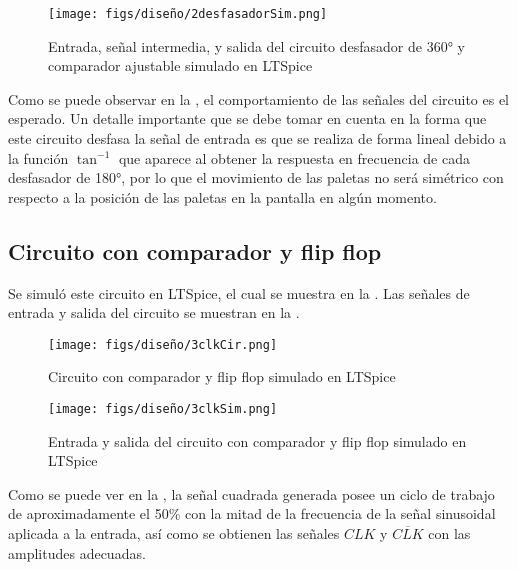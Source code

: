 \begin{figure}[H]
    \centering
    \texttt{[image: figs/diseño/2desfasadorSim.png]}
    \caption{Entrada, señal intermedia, y salida del circuito desfasador de 360° y comparador ajustable simulado en LTSpice}
    \label{desfasadorSim}
\end{figure}

Como se puede observar en la , el comportamiento de las señales del circuito es el esperado.
Un detalle importante que se debe tomar en cuenta en la forma que este circuito desfasa la señal de entrada es que se realiza de forma lineal debido a la función $\tan^{-1}$ que aparece al obtener la respuesta en frecuencia de cada desfasador de 180°, por lo que el movimiento de las paletas no será simétrico con respecto a la posición de las paletas en la pantalla en algún momento.

\subsection{Circuito con comparador y flip flop}
Se simuló este circuito en LTSpice, el cual se muestra en la .
Las señales de entrada y salida del circuito se muestran en la .

\begin{figure}[H]
    \centering
    \texttt{[image: figs/diseño/3clkCir.png]}
    \caption{Circuito con comparador y flip flop simulado en LTSpice}
    \label{clkCir}
\end{figure}

\begin{figure}[H]
    \centering
    \texttt{[image: figs/diseño/3clkSim.png]}
    \caption{Entrada y salida del circuito con comparador y flip flop simulado en LTSpice}
    \label{clkSim}
\end{figure}

Como se puede ver en la , la señal cuadrada generada posee un ciclo de trabajo de aproximadamente el 50\% con la mitad de la frecuencia de la señal sinusoidal aplicada a la entrada, así como se obtienen las señales $CLK$ y $\overline{CLK}$ con las amplitudes adecuadas. 
